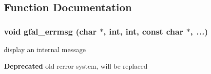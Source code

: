 \subsection{Function Documentation}
\subsubsection{\setlength{\rightskip}{0pt plus 5cm}void gfal\_\-errmsg (char $\ast$, int, int, const char $\ast$,  {\em ...})}\label{gfal__common_8h_53a1e14d422fda082f71f520468b79b3}


display an internal message 

\begin{Desc}
\item[\bf{Deprecated}]old rerror system, will be replaced \end{Desc}
